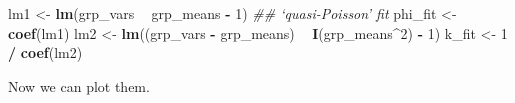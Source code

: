 \documentclass[
  12pt,
]{book}
\newenvironment{Shaded}{\begin{snugshade}}{\end{snugshade}}
\newcommand{\CommentTok}[1]{\textcolor[rgb]{0.56,0.35,0.01}{\textit{#1}}}
\newcommand{\DecValTok}[1]{\textcolor[rgb]{0.00,0.00,0.81}{#1}}
\newcommand{\KeywordTok}[1]{\textcolor[rgb]{0.13,0.29,0.53}{\textbf{#1}}}
\newcommand{\NormalTok}[1]{#1}
\newcommand{\OperatorTok}[1]{\textcolor[rgb]{0.81,0.36,0.00}{\textbf{#1}}}
\newcommand{\StringTok}[1]{\textcolor[rgb]{0.31,0.60,0.02}{#1}}
\begin{document}
\begin{Shaded}
\begin{Highlighting}[]
\NormalTok{lm1 <-}\StringTok{ }\KeywordTok{lm}\NormalTok{(grp_vars }\OperatorTok{~}\StringTok{ }\NormalTok{grp_means }\OperatorTok{-}\StringTok{ }\DecValTok{1}\NormalTok{) }\CommentTok{## `quasi-Poisson' fit}
\NormalTok{phi_fit <-}\StringTok{ }\KeywordTok{coef}\NormalTok{(lm1)}
\NormalTok{lm2 <-}\StringTok{ }\KeywordTok{lm}\NormalTok{((grp_vars }\OperatorTok{-}\StringTok{ }\NormalTok{grp_means) }\OperatorTok{~}\StringTok{ }\KeywordTok{I}\NormalTok{(grp_means}\OperatorTok{^}\DecValTok{2}\NormalTok{) }\OperatorTok{-}\StringTok{ }\DecValTok{1}\NormalTok{)}
\NormalTok{k_fit <-}\StringTok{ }\DecValTok{1} \OperatorTok{/}\StringTok{ }\KeywordTok{coef}\NormalTok{(lm2)}
\end{Highlighting}
\end{Shaded}

Now we can plot them.
\end{document}
